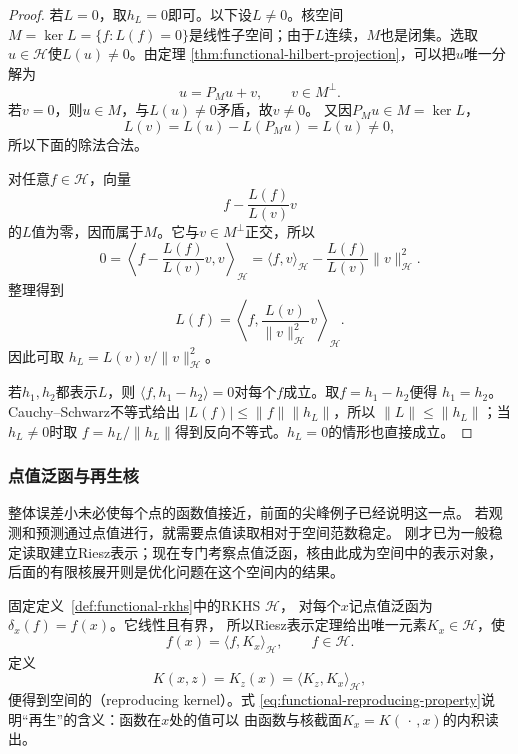 \begin{proof}
若$L=0$，取$h_L=0$即可。以下设$L\neq0$。核空间
$M=\ker L=\{f:L(f)=0\}$是线性子空间；由于$L$连续，$M$也是闭集。选取
$u\in\mathcal{H}$使$L(u)\neq0$。由定理
\ref{thm:functional-hilbert-projection}，可以把$u$唯一分解为
\[
  u=P_Mu+v,\qquad v\in M^\perp.
\]
若$v=0$，则$u\in M$，与$L(u)\neq0$矛盾，故$v\neq0$。
又因$P_Mu\in M=\ker L$，
\[
  L(v)=L(u)-L(P_Mu)=L(u)\neq0,
\]
所以下面的除法合法。

对任意$f\in\mathcal{H}$，向量
\[
  f-\frac{L(f)}{L(v)}v
\]
的$L$值为零，因而属于$M$。它与$v\in M^\perp$正交，所以
\[
  0
  =
  \left\langle
    f-\frac{L(f)}{L(v)}v,v
  \right\rangle_{\mathcal{H}}
  =
  \langle f,v\rangle_{\mathcal{H}}
  -
  \frac{L(f)}{L(v)}\lVert v\rVert_{\mathcal{H}}^2.
\]
整理得到
\[
  L(f)
  =
  \left\langle
    f,\frac{L(v)}{\lVert v\rVert_{\mathcal{H}}^2}v
  \right\rangle_{\mathcal{H}}.
\]
因此可取
$h_L=L(v)v/\lVert v\rVert_{\mathcal{H}}^2$。

若$h_1,h_2$都表示$L$，则
$\langle f,h_1-h_2\rangle=0$对每个$f$成立。取$f=h_1-h_2$便得
$h_1=h_2$。Cauchy--Schwarz不等式给出
$|L(f)|\leq\lVert f\rVert\lVert h_L\rVert$，所以
$\lVert L\rVert\leq\lVert h_L\rVert$；当$h_L\neq0$时取
$f=h_L/\lVert h_L\rVert$得到反向不等式。$h_L=0$的情形也直接成立。
\end{proof}
\subsubsection{点值泛函与再生核}
\label{sec:functional-positive-kernels-rkhs}

整体误差小未必使每个点的函数值接近，前面的尖峰例子已经说明这一点。
若观测和预测通过点值进行，就需要点值读取相对于空间范数稳定。
刚才已为一般稳定读取建立Riesz表示；现在专门考察点值泛函，核由此成为空间中的表示对象，
后面的有限核展开则是优化问题在这个空间内的结果。

固定定义~\ref{def:functional-rkhs}中的RKHS $\mathcal H$，
对每个$x$记点值泛函为$\delta_x(f)=f(x)$。它线性且有界，
所以Riesz表示定理给出唯一元素$K_x\in\mathcal{H}$，使
\begin{equation}
  f(x)=\langle f,K_x\rangle_{\mathcal{H}},
  \qquad f\in\mathcal{H}.
  \label{eq:functional-reproducing-property}
\end{equation}
定义
\[
  K(x,z)=K_z(x)
  =\langle K_z,K_x\rangle_{\mathcal{H}},
\]
便得到空间的（reproducing kernel）。式
\eqref{eq:functional-reproducing-property}说明“再生”的含义：函数在$x$处的值可以
由函数与核截面$K_x=K(\,\cdot\,,x)$的内积读出。

